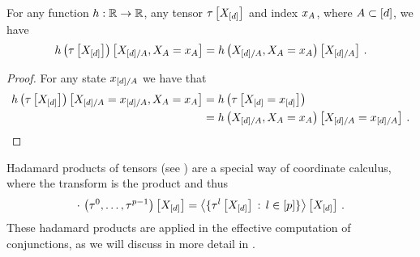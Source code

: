\begin{lemma}\label{lem:coordinatewisetrafoSliceReduction}
    For any function $h: \mathbb{R} \rightarrow \mathbb{R}$, any tensor $\tau\left[X_{[d]}\right]$ and index $x_{A}$, where $A\subset[d]$, we have
    \begin{align*}
        {h}\left(\tau\left[X_{[d]}\right]\right)\left[X_{[d]/A},X_{A}=x_{A}\right]
        = {h}\left(X_{[d]/A},X_{A}=x_{A}\right)\left[X_{[d]/A}\right] \, .
    \end{align*}
\end{lemma}
\begin{proof}
    For any state $x_{[d]/A}$ we have that
    \begin{align*}
        {h}\left(\tau\left[X_{[d]}\right]\right)\left[X_{[d]/A}=x_{[d]/A},X_{A}=x_{A}\right]
        &= h\left(\tau\left[X_{[d]}=x_{[d]}\right]\right) \\
        &= {h}\left(X_{[d]/A},X_{A}=x_{A}\right)\left[X_{[d]/A}=x_{[d]/A}\right] \, .
    \end{align*}
\end{proof}



\begin{example}
    Hadamard products of tensors (see ) are a special way of coordinate calculus, where the transform is the product and thus
    \begin{align*}
        {\cdot\,}\left(\tau^{0},\ldots,\tau^{p-1}\right)\left[X_{[d]}\right]
        = \left\langle \{\tau^{l}\left[X_{[d]}\right] \, : \, l\in[p] \}\right\rangle \left[ X_{[d]} \right] \, .
    \end{align*}
    These hadamard products are applied in the effective computation of conjunctions, as we will discuss in more detail in .
\end{example}


